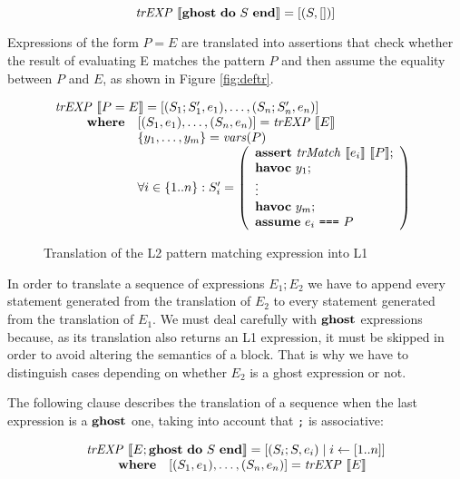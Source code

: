 \[
\mathit{trEXP}~\llbracket\textbf{ghost}~\textbf{do}~S~\textbf{end}\rrbracket = [(S, [])]
\]

Expressions of the form $P = E$ are translated into assertions that check
whether the result of evaluating E matches the pattern $P$ and then assume the
equality between $P$ and $E$, as shown in Figure \ref{fig:deftr}.

\begin{figure}
\[
\begin{array}{l}
\mathit{trEXP}~\llbracket P = E\rrbracket = [(S_1;S_1',e_1), \dots, (S_n;S_n', e_n)] \\
\qquad 
\begin{array}{ll}
\textbf{where} & [(S_1,e_1),\dots,(S_n, e_n)] = \mathit{trEXP}~\llbracket E\rrbracket \\
& \{y_1, \ldots, y_m\} = \mathit{vars}(P) \\
& \forall i \in \{1..n\}: S_i' = \left(
\begin{array}{l}
\textbf{assert}~\mathit{trMatch}~\llbracket e_i\rrbracket~\llbracket P\rrbracket;\\
\textbf{havoc}~y_1;\\
\vdots\\
\textbf{havoc}~y_m;\\
\textbf{assume}~e_i ~\texttt{===}~ P\\
\end{array}
\right)
\end{array}
\end{array}
\]
\caption{Translation of the L2 pattern matching expression into L1}
\label{fig:pattr}
\end{figure}

In order to translate a sequence of expressions $E_1;E_2$ we have to append 
every statement generated from the translation of $E_2$ to every statement 
generated from the translation of $E_1$. We must deal carefully with $\textbf{ghost}$
expressions because, as its translation also returns an L1 expression, it must
be skipped in order to avoid altering the semantics of a block. That is why we 
have to distinguish cases depending on whether $E_2$ is a ghost expression or
not.

The following clause describes the translation of a sequence when the last
expression is a $\textbf{ghost}$ one, taking into account that \verb|;| is associative:

\[
\begin{array}{l}
\mathit{trEXP}~\llbracket E;\textbf{ghost}~\textbf{do}~S~\textbf{end}\rrbracket = [(S_i;S,e_i) \mid i \leftarrow [1..n]] \\
\qquad 
\begin{array}{ll}
\textbf{where} & [(S_1,e_1),\dots,(S_n, e_n)] = \mathit{trEXP}~\llbracket E\rrbracket \\
\end{array}
\end{array}
\]

